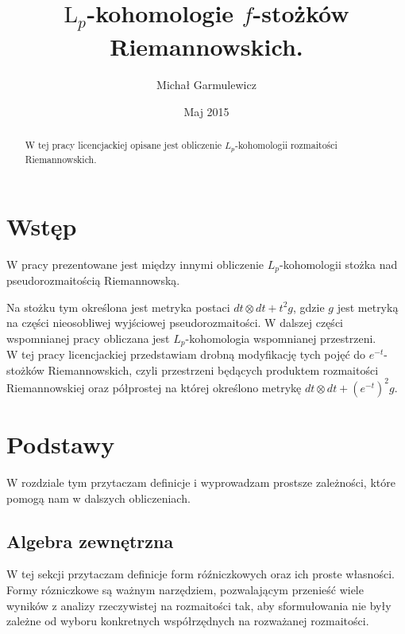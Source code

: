 \documentclass[licencjacka]{pracamgr}
\author{Michał Garmulewicz}
\title{$\mathrm{L}_p$-kohomologie $f$-stożków Riemannowskich.}
\date{Maj 2015}
\theoremstyle{definition}
\theoremstyle{definition}
\theoremstyle{plain}
\theoremstyle{plain}
\begin{document}
\maketitle

\begin{abstract}
  W tej pracy licencjackiej opisane jest obliczenie $L_p$-kohomologii
  rozmaitości Riemannowskich.
\end{abstract}

\tableofcontents

\chapter{Wstęp}

W pracy \cite{weber} prezentowane jest między innymi obliczenie
$L_p$-kohomologii stożka nad pseudorozmaitością Riemannowską. 

Na stożku tym określona jest metryka postaci
$dt \otimes dt + t^2 g$, gdzie $g$ 
jest metryką na części nieosobliwej wyjściowej pseudorozmaitości.
W dalszej części wspomnianej pracy obliczana jest $L_p$-kohomologia
wspomnianej przestrzeni.
\\


W tej pracy licencjackiej przedstawiam drobną modyfikację tych pojęć do
$e^{-t}$-stożków Riemannowskich, czyli przestrzeni będących produktem
rozmaitości Riemannowskiej oraz półprostej na której określono metrykę
$dt \otimes dt + (e^{-t})^2 g$. \\


\chapter{Podstawy}
W rozdziale tym przytaczam definicje i wyprowadzam prostsze zależności, które
pomogą nam w dalszych obliczeniach. \\


\section{Algebra zewnętrzna}
W tej sekcji przytaczam definicje form róźniczkowych oraz ich proste
własności. Formy rózniczkowe są ważnym narzędziem, pozwalającym
przenieść wiele wyników z analizy rzeczywistej na rozmaitości tak, aby
sformułowania nie były zależne od wyboru konkretnych współrzędnych na rozważanej
rozmaitości. \\
\end{document}
